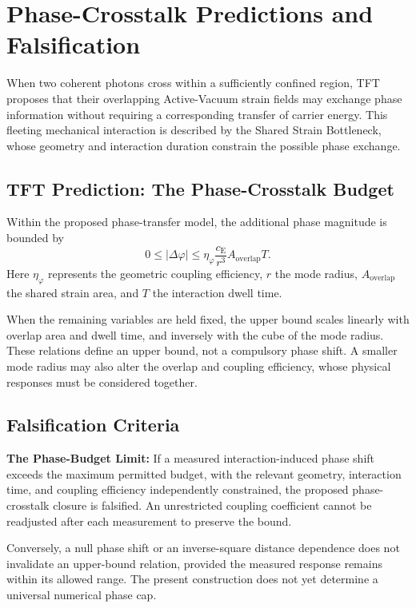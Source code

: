 \section{Phase-Crosstalk Predictions and Falsification}
\label{sec:AG_predictions_falsification}

When two coherent photons cross within a sufficiently confined
region, TFT proposes that their overlapping Active-Vacuum strain
fields may exchange phase information without requiring a
corresponding transfer of carrier energy. This fleeting
mechanical interaction is described by the Shared Strain
Bottleneck, whose geometry and interaction duration constrain
the possible phase exchange.

\subsection*{TFT Prediction: The Phase-Crosstalk Budget}

Within the proposed phase-transfer model, the additional
phase magnitude is bounded by
\[
0\leq|\Delta\varphi|
\leq
\eta_{\varphi}
\frac{c_{\mathrm E}}{r^3}
A_{\mathrm{overlap}}T.
\]
Here $\eta_{\varphi}$ represents the geometric coupling
efficiency, $r$ the mode radius, $A_{\mathrm{overlap}}$
the shared strain area, and $T$ the interaction dwell time.

When the remaining variables are held fixed, the upper
bound scales linearly with overlap area and dwell time,
and inversely with the cube of the mode radius.
These relations define an upper bound, not a compulsory
phase shift. A smaller mode radius may also alter the
overlap and coupling efficiency, whose physical responses
must be considered together.

\subsection*{Falsification Criteria}

\noindent\textbf{The Phase-Budget Limit:}
If a measured interaction-induced phase shift exceeds
the maximum permitted budget, with the relevant geometry,
interaction time, and coupling efficiency independently
constrained, the proposed phase-crosstalk closure is
falsified. An unrestricted coupling coefficient cannot
be readjusted after each measurement to preserve the bound.

Conversely, a null phase shift or an inverse-square
distance dependence does not invalidate an upper-bound
relation, provided the measured response remains within
its allowed range. The present construction does not
yet determine a universal numerical phase cap.

